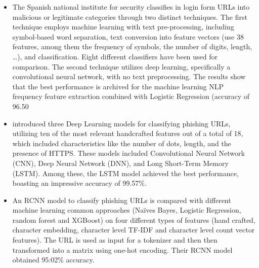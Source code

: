 \documentclass{article}
\begin{document}
    \begin{itemize}
        \item  The Spanish national institute for security classifies in\cite{PhishingLoginURLDetection} login form URLs into malicious or legitimate categories through two distinct techniques.
        The first technique employs machine learning with text pre-processing, including symbol-based word separation, text conversion into feature vectors (use 38 features, among them the frequency of symbols, the number of digits, length, \ldots), and classification.
        Eight different classifiers have been used for comparison.
        The second technique utilizes deep learning, specifically a convolutional neural network, with no text preprocessing.
        The results show that the best performance is archived for the machine learning NLP frequency feature extraction combined with Logistic Regression (accuracy of 96.50%


        \item \cite{EfficientDeepLearningPhishingDetection} introduced three Deep Learning models for classifying phishing URLs, utilizing ten of the most relevant handcrafted features out of a total of 18, which included characteristics like the number of dots, length, and the presence of HTTPS. These models included Convolutional Neural Network (CNN), Deep Neural Network (DNN), and Long Short-Term Memory (LSTM). Among these, the LSTM model achieved the best performance, boasting an impressive accuracy of 99.57\%.

        \item An RCNN model to classify phishing URLs is compared with different machine learning common approaches (Naïves Bayes, Logistic Regression, random forest and XGBoost) on four different types of features (hand crafted, character embedding, character level TF-IDF and character level count vector features)\cite{CharacterLevelCNN}.
        The URL is used as input for a tokenizer and then then transformed into a matrix using one-hot encoding.
        Their RCNN model obtained 95:02\% accuracy.

    \end{itemize}

%
%
%
\end{document}
